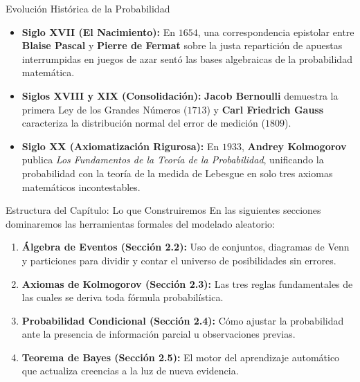 \documentclass[10pt,aspectratio=169]{beamer}
\begin{document}
\begin{frame}{Evolución Histórica de la Probabilidad}
  \begin{itemize}
    \item \textbf{Siglo XVII (El Nacimiento):} En $1654$, una correspondencia epistolar entre \textbf{Blaise Pascal} y \textbf{Pierre de Fermat} sobre la justa repartición de apuestas interrumpidas en juegos de azar sentó las bases algebraicas de la probabilidad matemática. \pause
    \item \textbf{Siglos XVIII y XIX (Consolidación):} \textbf{Jacob Bernoulli} demuestra la primera Ley de los Grandes Números ($1713$) y \textbf{Carl Friedrich Gauss} caracteriza la distribución normal del error de medición ($1809$). \pause
    \item \textbf{Siglo XX (Axiomatización Rigurosa):} En $1933$, \textbf{Andrey Kolmogorov} publica \emph{Los Fundamentos de la Teoría de la Probabilidad}, unificando la probabilidad con la teoría de la medida de Lebesgue en solo tres axiomas matemáticos incontestables.
  \end{itemize}
\end{frame}

\begin{frame}{Estructura del Capítulo: Lo que Construiremos}
  En las siguientes secciones dominaremos las herramientas formales del modelado aleatorio:
  \vspace{0.6em}
  \begin{enumerate}
    \item \textbf{Álgebra de Eventos (Sección 2.2):} Uso de conjuntos, diagramas de Venn y particiones para dividir y contar el universo de posibilidades sin errores. \pause
    \item \textbf{Axiomas de Kolmogorov (Sección 2.3):} Las tres reglas fundamentales de las cuales se deriva toda fórmula probabilística. \pause
    \item \textbf{Probabilidad Condicional (Sección 2.4):} Cómo ajustar la probabilidad ante la presencia de información parcial u observaciones previas. \pause
    \item \textbf{Teorema de Bayes (Sección 2.5):} El motor del aprendizaje automático que actualiza creencias a la luz de nueva evidencia.
  \end{enumerate}
\end{frame}
\end{document}
